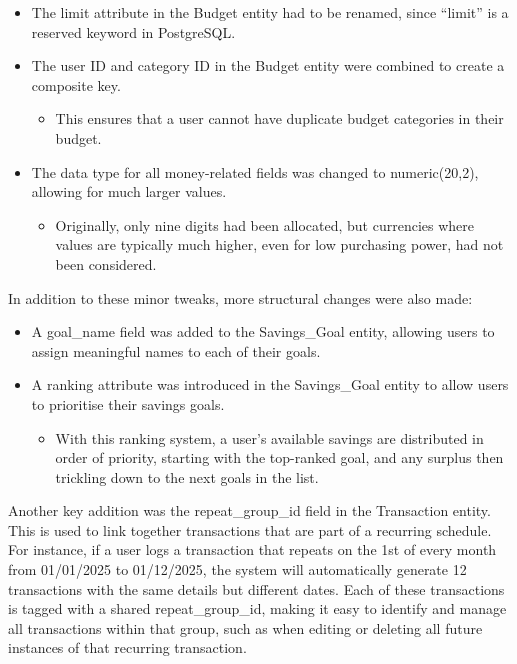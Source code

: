 \documentclass{l4proj}
\begin{document}
\begin{itemize}
    \item The limit attribute in the Budget entity had to be renamed, since “limit” is a reserved keyword in PostgreSQL.
    \item The user ID and category ID in the Budget entity were combined to create a composite key.
    \begin{itemize}
        \item This ensures that a user cannot have duplicate budget categories in their budget.
    \end{itemize}
    \item The data type for all money-related fields was changed to numeric(20,2), allowing for much larger values.
    \begin{itemize}
        \item Originally, only nine digits had been allocated, but currencies where values are typically much higher, even for low purchasing power, had not been considered.
    \end{itemize}
\end{itemize}

\vspace{0.5em}
In addition to these minor tweaks, more structural changes were also made:

\begin{itemize}
    \item A goal\_name field was added to the Savings\_Goal entity, allowing users to assign meaningful names to each of their goals.
    \item A ranking attribute was introduced in the Savings\_Goal entity to allow users to prioritise their savings goals.
    \begin{itemize}
        \item With this ranking system, a user's available savings are distributed in order of priority, starting with the top-ranked goal, and any surplus then trickling down to the next goals in the list.
    \end{itemize}
\end{itemize}

\vspace{0.5em}
Another key addition was the repeat\_group\_id field in the Transaction entity. This is used to link together transactions that are part of a recurring schedule. For instance, if a user logs a transaction that repeats on the 1st of every month from 01/01/2025 to 01/12/2025, the system will automatically generate 12 transactions with the same details but different dates. Each of these transactions is tagged with a shared repeat\_group\_id, making it easy to identify and manage all transactions within that group, such as when editing or deleting all future instances of that recurring transaction.
\end{document}
